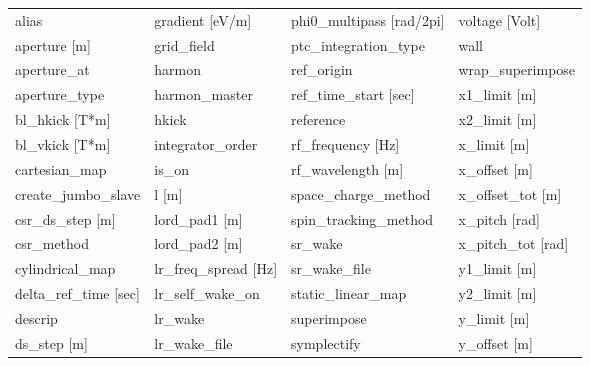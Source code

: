  \begin{tabular}{llll} \toprule
alias                            & gradient [eV/m]                  & phi0_multipass [rad/2pi]         & voltage [Volt]                   \\
aperture [m]                     & grid_field                       & ptc_integration_type             & wall                             \\
aperture_at                      & harmon                           & ref_origin                       & wrap_superimpose                 \\
aperture_type                    & harmon_master                    & ref_time_start [sec]             & x1_limit [m]                     \\
bl_hkick [T*m]                   & hkick                            & reference                        & x2_limit [m]                     \\
bl_vkick [T*m]                   & integrator_order                 & rf_frequency [Hz]                & x_limit [m]                      \\
cartesian_map                    & is_on                            & rf_wavelength [m]                & x_offset [m]                     \\
create_jumbo_slave               & l [m]                            & space_charge_method              & x_offset_tot [m]                 \\
csr_ds_step [m]                  & lord_pad1 [m]                    & spin_tracking_method             & x_pitch [rad]                    \\
csr_method                       & lord_pad2 [m]                    & sr_wake                          & x_pitch_tot [rad]                \\
cylindrical_map                  & lr_freq_spread [Hz]              & sr_wake_file                     & y1_limit [m]                     \\
delta_ref_time [sec]             & lr_self_wake_on                  & static_linear_map                & y2_limit [m]                     \\
descrip                          & lr_wake                          & superimpose                      & y_limit [m]                      \\
ds_step [m]                      & lr_wake_file                     & symplectify                      & y_offset [m]                     \\

\end{tabular}
